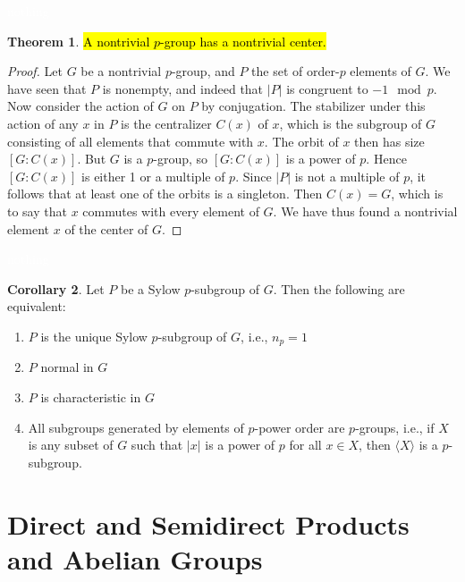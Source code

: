 \documentclass{article}
\theoremstyle{definition}
\newtheorem{thm}{Theorem}[section]
\newtheorem{cor}[thm]{Corollary}
\newcommand{\nl}{\textcolor{white}{nothing}}
\begin{document}
\nl

\begin{thm}
\hl{A nontrivial $p$-group has a nontrivial center.}
\end{thm}

\begin{proof}
Let $G$ be a nontrivial $p$-group, and $P$ the set of order-$p$ elements of $G$. We have seen that $P$ is nonempty, and indeed that $|P|$ is congruent to $-1 \mod p$. Now consider the action of $G$ on $P$ by conjugation. The stabilizer under this action of any $x$ in $P$ is the centralizer $C(x)$ of $x$, which is the subgroup of $G$ consisting of all elements that commute with $x$. The orbit of $x$ then has size $[G:C(x)]$. But $G$ is a $p$-group, so $[G:C(x)]$ is a power of $p$. Hence $[G:C(x)]$ is either 1 or a multiple of $p$. Since $|P|$ is not a multiple of $p$, it follows that at least one of the orbits is a singleton. Then $C(x)=G$, which is to say that $x$ commutes with every element of $G$. We have thus found a nontrivial element $x$ of the center of $G$.
\end{proof}

\nl

\begin{cor}
Let $P$ be a Sylow $p$-subgroup of $G$. Then the following are equivalent:
\begin{enumerate}
\item $P$ is the unique Sylow $p$-subgroup of $G$, i.e., $n_p = 1$
\item $P$ normal in $G$
\item $P$ is characteristic in $G$
\item All subgroups generated by elements of $p$-power order are $p$-groups, i.e., if $X$ is any subset of $G$ such that $|x|$ is a power of $p$ for all $x\in X$, then $\langle X\rangle$ is a $p$-subgroup.
\end{enumerate}
\end{cor}



\section{Direct and Semidirect Products and Abelian Groups}

\setcounter{thm}{0}
\end{document}
